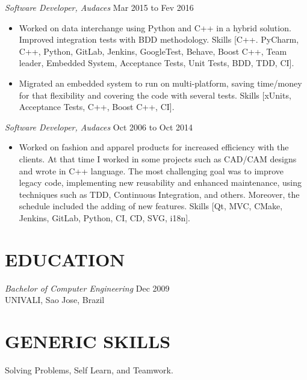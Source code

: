 \documentclass[line,margin]{res}
\begin{document}
\begin{resume}
                {\sl Software Developer, Audaces} \hfill Mar 2015 to Fev 2016 \\
                  \begin{itemize}
                    \item Worked on data interchange using Python and C++ in a hybrid solution. Improved integration tests with BDD methodology. Skills [C++. PyCharm, C++, Python, GitLab, Jenkins, GoogleTest, Behave, Boost C++, Team leader, Embedded System, Acceptance Tests, Unit Tests, BDD, TDD, CI].
                    \item Migrated an embedded system to run on multi-platform, saving time/money for that flexibility and covering the code with several tests. Skills [xUnits, Acceptance Tests, C++, Boost C++, CI].
                   \end{itemize}

                {\sl Software Developer, Audaces} \hfill Oct 2006 to Oct 2014 \\
                  \begin{itemize}
                   \item Worked on fashion and apparel products for increased efficiency with the clients. At that time I worked in some projects such as CAD/CAM designs and wrote in C++ language. The most challenging goal was to improve legacy code, implementing new reusability and enhanced maintenance, using techniques such as TDD, Continuous Integration, and others. Moreover, the schedule included the adding of new features. Skills [Qt, MVC, CMake, Jenkins, GitLab, Python, CI, CD, SVG, i18n].
                   \end{itemize}
\section{EDUCATION} {\sl Bachelor of Computer Engineering} \hfill Dec 2009\\
                UNIVALI, Sao Jose, Brazil
\section{GENERIC SKILLS} Solving Problems, Self Learn, and Teamwork.
\end{resume}
\end{document}
